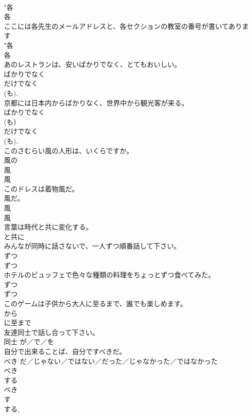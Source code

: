 \documentclass[8pt]{extreport}
\begin{document}
\begin{CJK}{UTF8}{min}
{{\\	"各 
\\	各 
\\	ここには各先生のメールアドレスと、各セクションの教室の番号が書いてあります	
\\	"各 
\\	各 
\\	あのレストランは、安いばかりでなく、とてもおいしい。	
\\	ばかりでなく 
\\	だけでなく
\\	(も). 
\\	京都には日本内からばかりなく、世界中から観光客が来る。	
\\	ばかりでなく 
\\	(も） 
\\	だけでなく
\\	(も). 
\\	このさむらい風の人形は、いくらですか。	
\\	風の 
\\	風 
\\	風 
\\	このドレスは着物風だ。	
\\	風だ。 
\\	風 
\\	風 
\\	言葉は時代と共に変化する。	
\\	と共に 
\\	みんなが同時に話さないで、一人ずつ順番話して下さい。	
\\	ずつ 
\\	ずつ 
\\	ホテルのビュッフェで色々な種類の料理をちょっとずつ食べてみた。	
\\	ずつ 
\\	ずつ 
\\	このゲームは子供から大人に至るまで、誰でも楽しめます。	
\\	から 
\\	に至まで 
\\	友達同士で話し合って下さい。	
\\	同士 {が／で／を} 
\\	自分で出来ることば、自分ですべきだ。	
\\	べき {だ／じゃない／ではない／だった／じゃなかった／ではなかった} 
\\	べき 
\\	する 
\\	べき 
\\	す 
\\	する, 
}}
\end{CJK}
\end{document}
